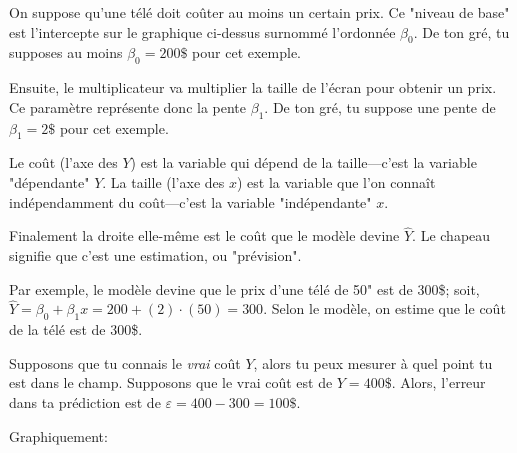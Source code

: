 \documentclass[10pt, french]{article}
\begin{document}
\begin{multicols*}{2}
\begin{center}

\end{center}

On suppose qu'une télé doit coûter au moins un certain prix. Ce "niveau de base" est l'intercepte sur le graphique ci-dessus surnommé l'ordonnée $\beta_{0}$. De ton gré, tu supposes au moins $\beta_{0} = 200\$$ pour cet exemple. 

Ensuite, le multiplicateur va multiplier la taille de l'écran pour obtenir un prix. Ce paramètre représente donc la pente $\beta_{1}$. De ton gré, tu suppose une pente de $\beta_{1} = 2\$$ pour cet exemple. 

Le coût (l'axe des $Y$) est la variable qui dépend de la taille---c'est la variable "dépendante" $Y$. La taille (l'axe des $x$) est la variable que l'on connaît indépendamment du coût---c'est la variable "indépendante" $x$. 

Finalement la droite elle-même est le coût que le modèle devine $\hat{Y}$. Le chapeau signifie que c'est une estimation, ou "prévision".

Par exemple, le modèle devine que le prix d'une télé de 50" est de 300\$; soit, $\hat{Y} = \beta_{0} + \beta_{1} x = 200 + (2) \cdot (50) = 300$. Selon le modèle, on estime que le coût de la télé est de 300\$.

Supposons que tu connais le \textit{vrai} coût $Y$, alors tu peux mesurer à quel point tu est dans le champ. Supposons que le vrai coût est de $Y = 400\$$. Alors, l'erreur dans ta prédiction est de $\varepsilon = 400 - 300 = 100\$$. 

Graphiquement:



\begin{tikzpicture}[x=0.75pt,y=0.75pt,yscale=-1,xscale=1]


\end{tikzpicture}
\end{multicols*}
\end{document}
